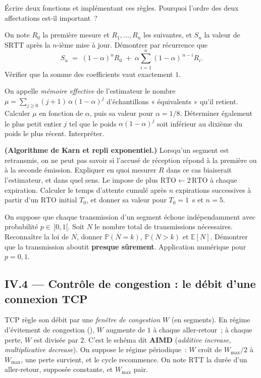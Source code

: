 \documentclass[11pt,a4paper]{article}
\begin{document}
\Q Écrire deux fonctions  et 
implémentant ces règles. Pourquoi l'ordre des deux affectations est-il important~?

\Q On note $R_0$ la première mesure et $R_1,\dots,R_n$ les suivantes, et $S_n$ la valeur de
$\mathrm{SRTT}$ après la $n$-ième mise à jour. Démontrer par récurrence que
\[ S_n \;=\; (1-\alpha)^n R_0 \;+\; \alpha\sum_{i=1}^{n}(1-\alpha)^{\,n-i}R_i . \]
Vérifier que la somme des coefficients vaut exactement $1$.

\Q On appelle \emph{mémoire effective} de l'estimateur le nombre $\mu=\sum_{j\ge 0}(j+1)\,
\alpha(1-\alpha)^j$ d'échantillons « équivalents » qu'il retient. Calculer $\mu$ en fonction
de $\alpha$, puis sa valeur pour $\alpha=1/8$. Déterminer également le plus petit entier $j$
tel que le poids $\alpha(1-\alpha)^j$ soit inférieur au dixième du poids le plus récent.
Interpréter.

\Q \textbf{(Algorithme de Karn et repli exponentiel.)} Lorsqu'un segment est retransmis, on
ne peut pas savoir si l'accusé de réception répond à la première ou à la seconde émission.
Expliquer en quoi mesurer $R$ dans ce cas biaiserait l'estimateur, et dans quel sens. Le
 impose de plus $\mathrm{RTO}\leftarrow 2\,\mathrm{RTO}$ à chaque expiration.
Calculer le temps d'attente cumulé après $n$ expirations successives à partir d'un
$\mathrm{RTO}$ initial $T_0$, et donner sa valeur pour $T_0=1$~s et $n=5$.

\Q On suppose que chaque transmission d'un segment échoue indépendamment avec probabilité
$p\in\,]0,1[$. Soit $N$ le nombre total de transmissions nécessaires. Reconnaître la loi de
$N$, donner $\mathbb{P}(N=k)$, $\mathbb{P}(N>k)$ et $\mathbb{E}[N]$. Démontrer que la
transmission aboutit \textbf{presque sûrement}. Application numérique pour $p=0{,}1$.

\subsection*{IV.4 --- Contrôle de congestion : le débit d'une connexion TCP}

TCP règle son débit par une \emph{fenêtre de congestion} $W$ (en segments). En régime
d'évitement de congestion (), $W$ augmente de $1$ à chaque aller-retour~; à chaque
perte, $W$ est divisée par $2$. C'est le schéma dit \textbf{AIMD} (\emph{additive increase,
multiplicative decrease}). On suppose le régime périodique~: $W$ croît de $W_{\max}/2$ à
$W_{\max}$, une perte survient, et le cycle recommence. On note $\mathrm{RTT}$ la durée d'un
aller-retour, supposée constante, et $W_{\max}$ pair.
\end{document}
